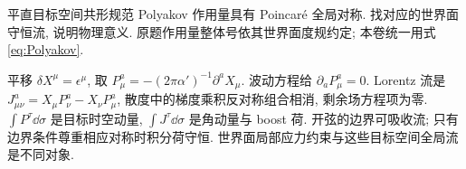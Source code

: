 \begin{exercise}
平直目标空间共形规范 Polyakov 作用量具有 Poincaré 全局对称. 找对应的世界面守恒流, 说明物理意义. 原题作用量整体号依其世界面度规约定; 本卷统一用式\eqref{eq:Polyakov}.
\end{exercise}
\begin{solution}
平移 $\delta X^\mu=\epsilon^\mu$, 取 $P^a_\mu=-(2\pi\alpha')^{-1}\partial^aX_\mu$. 波动方程给 $\partial_aP^a_\mu=0$. Lorentz 流是 $J^a_{\mu\nu}=X_\mu P^a_\nu-X_\nu P^a_\mu$, 散度中的梯度乘积反对称组合相消, 剩余场方程项为零. $\int P^\tau\dd\sigma$ 是目标时空动量, $\int J^\tau\dd\sigma$ 是角动量与 boost 荷. 开弦的边界可吸收流; 只有边界条件尊重相应对称时积分荷守恒. 世界面局部应力约束与这些目标空间全局流是不同对象.
\end{solution}

